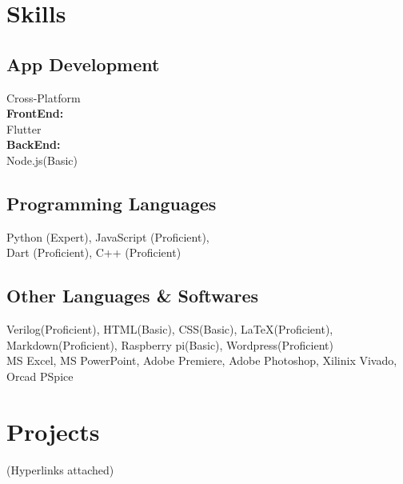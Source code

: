 \documentclass[]{m abbas resume' 2022}
\begin{document}
\begin{minipage}[t]{0.39\textwidth}



\section{Skills}
\subsection{App Development}
Cross-Platform\\
\textbf{FrontEnd:}\\ Flutter \\
\textbf{BackEnd:}\\ Node.js(Basic)\\

\subsection{Programming Languages}
Python (Expert), 
JavaScript (Proficient), \\
Dart (Proficient), 
C++ (Proficient)

\subsection{Other Languages \& Softwares}
Verilog(Proficient), 
HTML(Basic),
CSS(Basic),
LaTeX(Proficient),
Markdown(Proficient), 
Raspberry pi(Basic), 
Wordpress(Proficient) \\

MS Excel, 
MS PowerPoint, 
Adobe Premiere, 
Adobe Photoshop, 
Xilinix Vivado,
Orcad PSpice


\section{Projects}
    (Hyperlinks attached)

\end{minipage}
\end{document}
